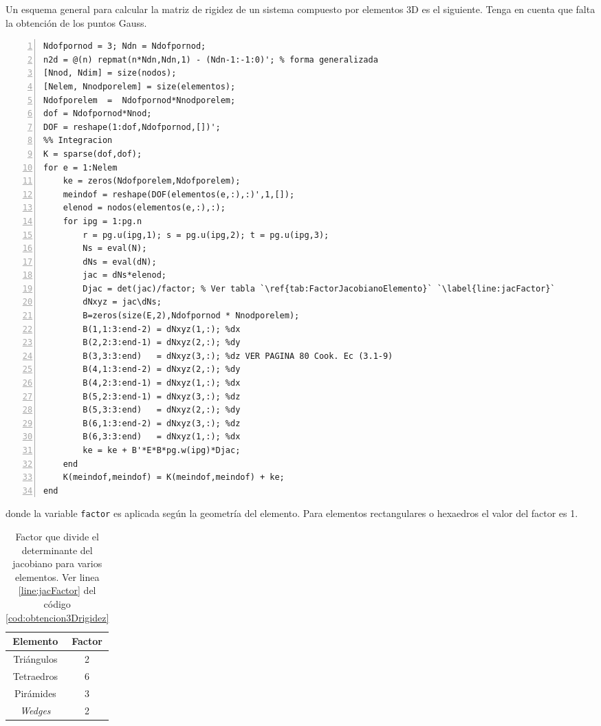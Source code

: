 Un esquema general para calcular la matriz de rigidez de un sistema compuesto por elementos 3D es el siguiente. Tenga en cuenta que falta la obtención de los puntos Gauss.
\begin{lstlisting}[caption={Programa generalizado para obtener \( \MK \) para elementos 3D.},numbers=left,label={cod:obtencion3Drigidez}]
%% Dofinitions
Ndofpornod = 3; Ndn = Ndofpornod;
n2d = @(n) repmat(n*Ndn,Ndn,1) - (Ndn-1:-1:0)'; % forma generalizada
[Nnod, Ndim] = size(nodos);
[Nelem, Nnodporelem] = size(elementos);
Ndofporelem  =  Ndofpornod*Nnodporelem;
dof = Ndofpornod*Nnod;
DOF = reshape(1:dof,Ndofpornod,[])';
%% Integracion
K = sparse(dof,dof);
for e = 1:Nelem
    ke = zeros(Ndofporelem,Ndofporelem);
    meindof = reshape(DOF(elementos(e,:),:)',1,[]);
    elenod = nodos(elementos(e,:),:);
    for ipg = 1:pg.n
        r = pg.u(ipg,1); s = pg.u(ipg,2); t = pg.u(ipg,3);
        Ns = eval(N);
        dNs = eval(dN); 
        jac = dNs*elenod;
        Djac = det(jac)/factor; % Ver tabla `\ref{tab:FactorJacobianoElemento}` `\label{line:jacFactor}`
        dNxyz = jac\dNs;
        B=zeros(size(E,2),Ndofpornod * Nnodporelem);
        B(1,1:3:end-2) = dNxyz(1,:); %dx
        B(2,2:3:end-1) = dNxyz(2,:); %dy  
        B(3,3:3:end)   = dNxyz(3,:); %dz VER PAGINA 80 Cook. Ec (3.1-9)
        B(4,1:3:end-2) = dNxyz(2,:); %dy
        B(4,2:3:end-1) = dNxyz(1,:); %dx
        B(5,2:3:end-1) = dNxyz(3,:); %dz
        B(5,3:3:end)   = dNxyz(2,:); %dy
        B(6,1:3:end-2) = dNxyz(3,:); %dz
        B(6,3:3:end)   = dNxyz(1,:); %dx
        ke = ke + B'*E*B*pg.w(ipg)*Djac;
    end
    K(meindof,meindof) = K(meindof,meindof) + ke;
end
\end{lstlisting}
donde la variable \texttt{factor} es aplicada según la geometría del elemento. Para elementos rectangulares o hexaedros el valor del factor es 1. 

\begin{table}[htb!]
    \centering
    \begin{tabular}{c|c}
        Elemento & Factor \\ \hline
        Triángulos & 2 \\
        Tetraedros & 6 \\
        Pirámides  &  3 \\
        \emph{Wedges}& 2  \\
    \end{tabular}
\caption{Factor que divide el determinante del jacobiano para varios elementos. Ver linea \ref{line:jacFactor} del código \ref{cod:obtencion3Drigidez}}
\label{tab:FactorJacobianoElemento}
\end{table}

